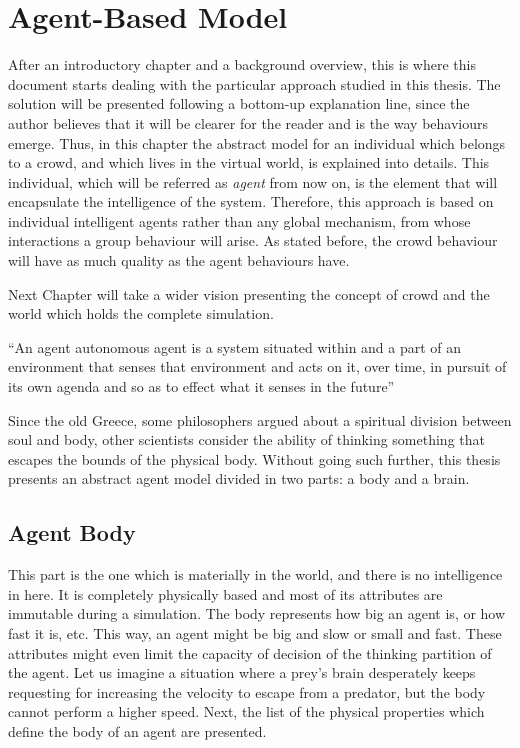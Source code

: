 \ifx\isEmbedded\undefined

\graphicspath{{../img/}}

\fi

\chapter{Agent-Based Model}
\label{chap:agent-based model}

After an introductory chapter and a background overview, this is where this document starts dealing with the particular approach studied in this thesis. The solution will be presented following a bottom-up explanation line, since the author believes that it will be clearer for the reader and is the way behaviours emerge. Thus, in this chapter the abstract model for an individual which belongs to a crowd, and which lives in the virtual world, is explained into details. This individual, which will be referred as \emph{agent} from now on, is the element that will encapsulate the intelligence of the system. Therefore, this approach is based on individual intelligent agents rather than any global mechanism, from whose interactions a group behaviour will arise. As stated before, the crowd behaviour will have as much quality as the agent behaviours have.

Next Chapter will take a wider vision presenting the concept of crowd and the world which holds the complete simulation.

``An agent autonomous agent is a system situated within and a part of an environment that senses that environment and acts on it, over time, in pursuit of its own agenda and so as to effect what it senses in the future'' \cite{buckland}

Since the old Greece, some philosophers argued about a spiritual division between soul and body, other scientists consider the ability of thinking something that escapes the bounds of the physical body. Without going such further, this thesis presents an abstract agent model divided in two parts: a body and a brain.

\section{Agent Body}

This part is the one which is materially in the world, and there is no intelligence in here. It is completely physically based and most of its attributes are immutable during a simulation. The body represents how big an agent is, or how fast it is, etc. This way, an agent might be big and slow or small and fast. These attributes might even limit the capacity of decision of the thinking partition of the agent. Let us imagine a situation where a prey's brain desperately keeps requesting for increasing the velocity to escape from a predator, but the body cannot perform a higher speed. Next, the list of the physical properties which define the body of an agent are presented.

